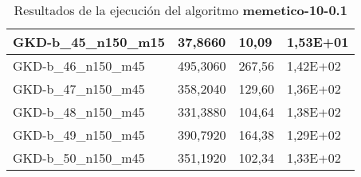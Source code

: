 \begin{table}[!ht]
\begin{adjustbox}{height=12cm}
\begin{tabular}{|l|l|l|l|}
		GKD-b\_45\_n150\_m15 & 37,8660  & 10,09          & 1,53E+01 \\ \hline
		GKD-b\_46\_n150\_m45 & 495,3060 & 267,56         & 1,42E+02 \\ \hline
		GKD-b\_47\_n150\_m45 & 358,2040 & 129,60         & 1,36E+02 \\ \hline
		GKD-b\_48\_n150\_m45 & 331,3880 & 104,64         & 1,38E+02 \\ \hline
		GKD-b\_49\_n150\_m45 & 390,7920 & 164,38         & 1,29E+02 \\ \hline
		GKD-b\_50\_n150\_m45 & 351,1920 & 102,34         & 1,33E+02 \\ \hline
    \end{tabular}
    \end{adjustbox}
    \caption{Resultados de la ejecución del algoritmo \textbf{memetico-10-0.1}}
\end{table}

\pagebreak